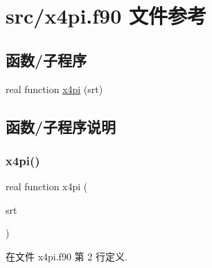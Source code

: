 \hypertarget{x4pi_8f90}{}\section{src/x4pi.f90 文件参考}
\label{x4pi_8f90}
\subsection*{函数/子程序}
\begin{DoxyCompactItemize}
\item 
real function \mbox{\hyperlink{x4pi_8f90_ac5cb0e5b402316190f4a7f3487df0e89}{x4pi}} (srt)
\end{DoxyCompactItemize}


\subsection{函数/子程序说明}
\mbox{\label{x4pi_8f90_ac5cb0e5b402316190f4a7f3487df0e89}} 
\subsubsection{\texorpdfstring{x4pi()}{x4pi()}}
{\footnotesize\ttfamily real function x4pi (\begin{DoxyParamCaption}\item[{}]{srt }\end{DoxyParamCaption})}



在文件 x4pi.\+f90 第 2 行定义.

